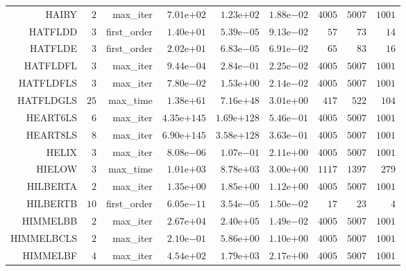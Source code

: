 \begin{longtable}{rrrrrrrrr}
HAIRY & \(     2\) & max\_iter & \( 7.01\)e\(+02\) & \( 1.23\)e\(+02\) & \( 1.88\)e\(-02\) & \(  4005\) & \(  5007\) & \(  1001\) \\
HATFLDD & \(     3\) & first\_order & \( 1.40\)e\(+01\) & \( 5.39\)e\(-05\) & \( 9.13\)e\(-02\) & \(    57\) & \(    73\) & \(    14\) \\
HATFLDE & \(     3\) & first\_order & \( 2.02\)e\(+01\) & \( 6.83\)e\(-05\) & \( 6.91\)e\(-02\) & \(    65\) & \(    83\) & \(    16\) \\
HATFLDFL & \(     3\) & max\_iter & \( 9.44\)e\(-04\) & \( 2.84\)e\(-01\) & \( 2.25\)e\(-02\) & \(  4005\) & \(  5007\) & \(  1001\) \\
HATFLDFLS & \(     3\) & max\_iter & \( 7.80\)e\(-02\) & \( 1.53\)e\(+00\) & \( 2.14\)e\(-02\) & \(  4005\) & \(  5007\) & \(  1001\) \\
HATFLDGLS & \(    25\) & max\_time & \( 1.38\)e\(+61\) & \( 7.16\)e\(+48\) & \( 3.01\)e\(+00\) & \(   417\) & \(   522\) & \(   104\) \\
HEART6LS & \(     6\) & max\_iter & \(4.35\)e\(+145\) & \(1.69\)e\(+128\) & \( 5.46\)e\(-01\) & \(  4005\) & \(  5007\) & \(  1001\) \\
HEART8LS & \(     8\) & max\_iter & \(6.90\)e\(+145\) & \(3.58\)e\(+128\) & \( 3.63\)e\(-01\) & \(  4005\) & \(  5007\) & \(  1001\) \\
HELIX & \(     3\) & max\_iter & \( 8.08\)e\(-06\) & \( 1.07\)e\(-01\) & \( 2.11\)e\(+00\) & \(  4005\) & \(  5007\) & \(  1001\) \\
HIELOW & \(     3\) & max\_time & \( 1.01\)e\(+03\) & \( 8.78\)e\(+03\) & \( 3.00\)e\(+00\) & \(  1117\) & \(  1397\) & \(   279\) \\
HILBERTA & \(     2\) & max\_iter & \( 1.35\)e\(+00\) & \( 1.85\)e\(+00\) & \( 1.12\)e\(+00\) & \(  4005\) & \(  5007\) & \(  1001\) \\
HILBERTB & \(    10\) & first\_order & \( 6.05\)e\(-11\) & \( 3.54\)e\(-05\) & \( 1.50\)e\(-02\) & \(    17\) & \(    23\) & \(     4\) \\
HIMMELBB & \(     2\) & max\_iter & \( 2.67\)e\(+04\) & \( 2.40\)e\(+05\) & \( 1.49\)e\(-02\) & \(  4005\) & \(  5007\) & \(  1001\) \\
HIMMELBCLS & \(     2\) & max\_iter & \( 2.10\)e\(-01\) & \( 5.86\)e\(+00\) & \( 1.10\)e\(+00\) & \(  4005\) & \(  5007\) & \(  1001\) \\
HIMMELBF & \(     4\) & max\_iter & \( 4.54\)e\(+02\) & \( 1.79\)e\(+03\) & \( 2.17\)e\(+00\) & \(  4005\) & \(  5007\) & \(  1001\) \\

\end{longtable}
